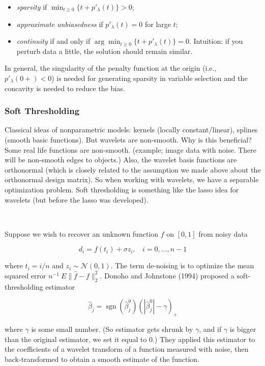 \begin{itemize}

\item \textit{sparsity} if \(\min_{t \geq 0} \{t + p'_\lambda (t) \} > 0\);

\item \textit{approximate unbiasedness} if \(p'_\lambda(t) = 0\) for large \(t\);

\item \textit{continuity} if and only if \(\arg \min_{t \geq 0} \{t + p'_\lambda(t) \} = 0\). Intuition: if you perturb data a little, the solution should remain similar. 

\end{itemize}

In general, the singularity of the penalty function at the origin (i.e., \(p'_\lambda(0+) < 0\)) is needed for generating sparsity in variable selection and the concavity is needed to reduce the bias.


\subsubsection{Soft Thresholding}

Classical ideas of nonparametric models: kernels (locally constant/linear), splines (smooth basic functions). But wavelets are non-smooth. Why is this beneficial? Some real life functions are non-smooth. (example; image data with noise. There will be non-smooth edges to objects.) Also, the wavelet basis functions are orthonormal (which is closely related to the assumption we made above about the orthonormal design matrix). So when working with wavelets, we have a separable optimization problem. Soft thresholding is something like the lasso idea for wavelets (but before the lasso was developed).


\

Suppose we wish to recover an unknown function \(f\) on \([0,1]\) from noisy data

\[
d_i = f(t_i) + \sigma z_i, \ \ \ \ i=0, \ldots, n-1
\]

where \(t_i = i/n\) and \(z_i \sim \mathcal{N}(0,1)\). The term de-noising is to optimize the mean squared error \(n^{-1}\ E \lVert \hat{f} - f \rVert_2^2\). Donoho and Johnstone (1994) proposed a soft-thresholding estimator

\[
\hat{\beta}_j = \operatorname{sgn}(\hat{\beta}_j^0) (| \hat{\beta}_j^0| - \gamma)_+
\]

where \(\gamma\) is some small number. (So estimator gets shrunk by \(\gamma\), and if \(\gamma\) is bigger than the original estimator, we set it equal to 0.) They applied this estimator to the coefficients of a wavelet transform of a function measured with noise, then back-transformed to obtain a smooth estimate of the function.

